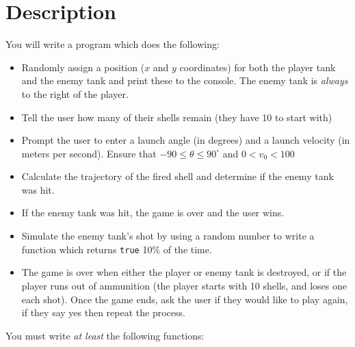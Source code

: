 \documentclass{article}
\begin{document}
\section*{Description}
You will write a program which does the following:
\begin{itemize}
	\item Randomly assign a position ($x$ and $y$ coordinates) for both the player tank and the enemy tank and print these to the console. The enemy tank is \textit{always} to the right of the player.
	\item Tell the user how many of their shells remain (they have 10 to start with)
	\item Prompt the user to enter a launch angle (in degrees) and a launch velocity (in meters per second). Ensure that $-90\leq\theta\leq90^\circ$ and $0<v_0<100$
	\item Calculate the trajectory of the fired shell and determine if the enemy tank was hit.
	\item If the enemy tank was hit, the game is over and the user wins.
	\item Simulate the enemy tank's shot by using a random number to write a function which returns \texttt{true} 10\% of the time. 
	\item The game is over when either the player or enemy tank is destroyed, or if the player runs out of ammunition (the player starts with 10 shells, and loses one each shot). Once the game ends, ask the user if they would like to play again, if they say yes then repeat the process.
\end{itemize}
You must write \textit{at least} the following functions:
\end{document}

